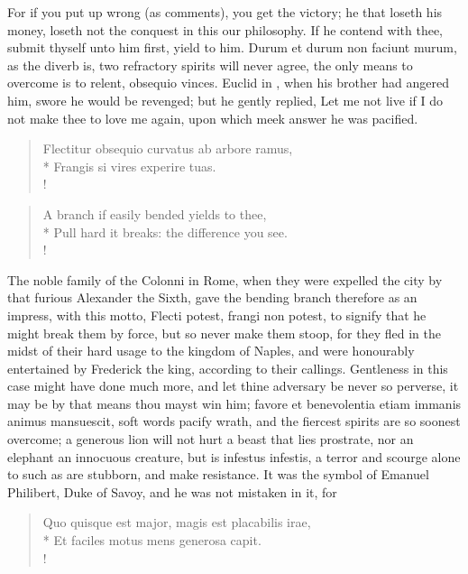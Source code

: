 {For if you put up wrong (as \Chrysostom comments), you get the
victory; he that loseth his money, loseth not the conquest in this our
philosophy. If he contend with thee, submit thyself unto him first,
yield to him. Durum et durum non faciunt murum, as the diverb is, two
refractory spirits will never agree, the only means to overcome is to
relent, obsequio vinces. Euclid in \Plutarch, when his brother had
angered him, swore he would be revenged; but he gently replied,
Let me not live if I do not make thee to love me again, upon
which meek answer he was pacified.
%
\begin{latin}%
\begin{verse}%
Flectitur obsequio curvatus ab arbore ramus,\\*
Frangis si vires experire tuas.\\!
\end{verse}%
\end{latin}%
\translationrule%
\begin{verse}%
A branch if easily bended yields to thee,\\*
Pull hard it breaks: the difference you see.\\!
\end{verse}%
%
The noble family of the Colonni in Rome, when they were expelled the
city by that furious Alexander the Sixth, gave the bending branch
therefore as an impress, with this motto, Flecti potest, frangi non
potest, to signify that he might break them by force, but so never make
them stoop, for they fled in the midst of their hard usage to the
kingdom of Naples, and were honourably entertained by Frederick the
king, according to their callings. Gentleness in this case might have
done much more, and let thine adversary be never so perverse, it may be
by that means thou mayst win him;  favore et benevolentia etiam
immanis animus mansuescit, soft words pacify wrath, and the fiercest
spirits are so soonest overcome; a generous lion will not hurt a
beast that lies prostrate, nor an elephant an innocuous creature, but
is infestus infestis, a terror and scourge alone to such as are
stubborn, and make resistance. It was the symbol of Emanuel Philibert,
Duke of Savoy, and he was not mistaken in it, for
%
%
\begin{latin}%
\begin{verse}%
Quo quisque est major, magis est placabilis irae,\\*
Et faciles motus mens generosa capit.\\!

\end{verse}
\end{latin}}
